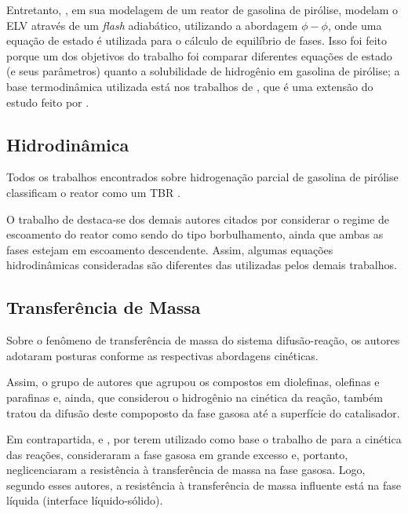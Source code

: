 Entretanto, , em sua modelagem de um reator de
gasolina de pirólise, modelam o ELV através de um \emph{flash} adiabático,
utilizando a abordagem $\phi-\phi$, onde uma equação de estado é utilizada para
o cálculo de equilíbrio de fases. Isso foi feito porque um dos objetivos do
trabalho foi comparar diferentes equações de estado (e seus parâmetros) quanto a
solubilidade de hidrogênio em gasolina de pirólise; a base termodinâmica
utilizada está nos trabalhos de , que é uma extensão do
estudo feito por .

\subsection{Hidrodinâmica} \label{sec:hidrodinamica}
Todos os trabalhos encontrados sobre hidrogenação parcial de gasolina de
pirólise classificam o reator como um TBR \cite{Arpornwichanop2002,
Authayanun2008, Mostoufi2005a, Arpornwichanop2008, Rojas2014a}. 

O trabalho de  destaca-se dos demais autores
citados por considerar o regime de escoamento do reator como sendo do tipo
borbulhamento, ainda que ambas as fases estejam em escoamento descendente.
Assim, algumas equações hidrodinâmicas consideradas são diferentes das
utilizadas pelos demais trabalhos.

\subsection{Transferência de Massa} \label{sec:transferenciamassa}

Sobre o fenômeno de transferência de massa do sistema difusão-reação, 
os autores adotaram posturas conforme as respectivas abordagens cinéticas.

Assim, o grupo de autores que agrupou os compostos em diolefinas, olefinas e
parafinas \cite{Arpornwichanop2002, Authayanun2008} e, ainda, que considerou o
hidrogênio na cinética da reação, também tratou da difusão deste compoposto da
fase gasosa até a superfície do catalisador. 

Em contrapartida,  e , por
terem utilizado como base o trabalho de  para a cinética
das reações, consideraram a fase gasosa em grande excesso e, portanto,
neglicenciaram a resistência à transferência de massa na fase gasosa.
Logo, segundo esses autores, a resistência à transferência de massa influente
está na fase líquida (interface líquido-sólido).

